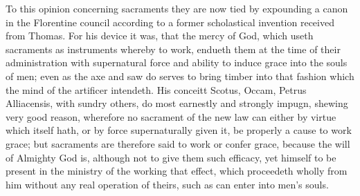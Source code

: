 To this opinion concerning sacraments they are now tied by expounding a canon in the Florentine council according to a former scholastical invention received from Thomas. For his device it was, that the mercy of God, which useth sacraments as instruments whereby to work, endueth them at the time of their administration with supernatural force and ability to induce grace into the souls of men; even as the axe and saw do serves to bring timber into that fashion which the mind of the artificer intendeth. His conceitt  Scotus, Occam, Petrus Alliacensis, with sundry others, do most earnestly and strongly impugn, shewing very good reason, wherefore no sacrament of the new law can either by virtue which itself hath, or by force supernaturally given it, be properly a cause to work grace; but sacraments are therefore said to work or confer grace, because the will of Almighty God is, although not to give them such efficacy, yet himself to be present in the ministry of the working that effect, which proceedeth wholly from him without any real operation of theirs, such as can enter into men’s souls.


